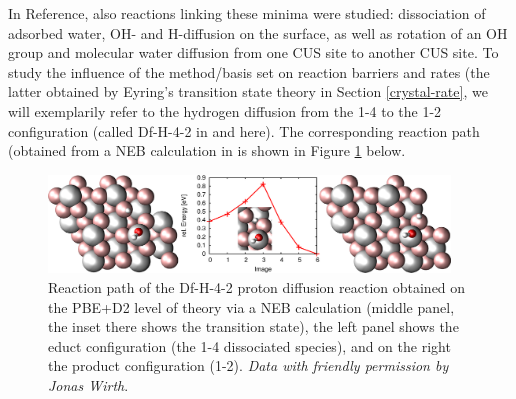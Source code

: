 \documentclass[11pt,DIV=13,BCOR=5mm,a4paper,headinclude]{scrbook}
\begin{document}
In Reference\cite{WirthJPCC2012}, also reactions linking these minima were studied: dissociation of adsorbed water, OH- and H-diffusion on the surface, as well as rotation of an OH group and molecular water diffusion from one CUS site to another CUS site.
To study the influence of the method/basis set on reaction barriers and rates (the latter obtained by Eyring's transition state theory in Section \ref{crystal-rate}, we will exemplarily refer to the hydrogen diffusion from the 1-4 to the 1-2 configuration (called Df-H-4-2 in \cite{WirthJPCC2012} and here).
The corresponding reaction path (obtained from a NEB calculation in \cite{WirthJPCC2012} is shown in Figure \ref{abb:df-h-4-2} below.
\begin{figure}[h]
\centering
\includegraphics[width=0.95\textwidth]{figures/0001/NEB-path/df-h-4-2.pdf}
\caption{Reaction path of the Df-H-4-2 proton diffusion reaction obtained on the PBE+D2 level of theory via a NEB calculation (middle panel, the inset there shows the transition state), the left panel shows the educt configuration (the 1-4 dissociated species), and on the right the product configuration (1-2).
\textit{Data with friendly permission by Jonas Wirth}.}
       \label{abb:df-h-4-2}
\end{figure}
\end{document}
